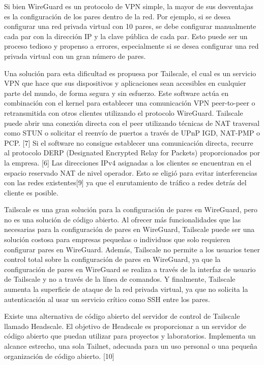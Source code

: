 \documentclass[letterpaper,12pt,oneside]{article}
\begin{document}
Si bien WireGuard es un protocolo de VPN simple, la mayor de sus desventajas es la configuración de los pares dentro de la red. Por ejemplo, si se desea configurar una red privada virtual con 10 pares, se debe configurar manualmente cada par con la dirección IP y la clave pública de cada par. Esto puede ser un proceso tedioso y propenso a errores, especialmente si se desea configurar una red privada virtual con un gran número de pares.

Una solución para esta dificultad es propuesa por Tailscale, el cual es un servicio VPN que hace que sus dispositivos y aplicaciones sean accesibles en cualquier parte del mundo, de forma segura y sin esfuerzo. Este software actúa en combinación con el kernel para establecer una comunicación VPN peer-to-peer o retransmitida con otros clientes utilizando el protocolo WireGuard. Tailscale puede abrir una conexión directa con el peer utilizando técnicas de NAT traversal como STUN o solicitar el reenvío de puertos a través de UPnP IGD, NAT-PMP o PCP. [7] Si el software no consigue establecer una comunicación directa, recurre al protocolo DERP (Designated Encrypted Relay for Packets) proporcionados por la empresa. [6] Las direcciones IPv4 asignadas a los clientes se encuentran en el espacio reservado NAT de nivel operador. Esto se eligió para evitar interferencias con las redes existentes[9] ya que el enrutamiento de tráfico a redes detrás del cliente es posible.

Tailscale es una gran solución para la configuración de pares en WireGuard, pero no es una solución de código abierto. Al ofrecer más funcionalidades que las necesarias para la configuración de pares en WireGuard, Tailscale puede ser una solución costosa para empresas pequeñas o individuos que solo requieren configurar pares en WireGuard. Además, Tailscale no permite a los usuarios tener control total sobre la configuración de pares en WireGuard, ya que la configuración de pares en WireGuard se realiza a través de la interfaz de usuario de Tailscale y no a través de la línea de comandos. Y finalmente, Tailscale aumenta la superficie de ataque de la red privada virtual, ya que no solicita la autenticación al usar un servicio crítico como SSH entre los pares.

Existe una alternativa de código abierto del servidor de control de Tailscale llamado Headscale. El objetivo de Headscale es proporcionar a un servidor de código abierto que puedan utilizar para proyectos y laboratorios. Implementa un alcance estrecho, una sola Tailnet, adecuada para un uso personal o una pequeña organización de código abierto. [10]
\end{document}
